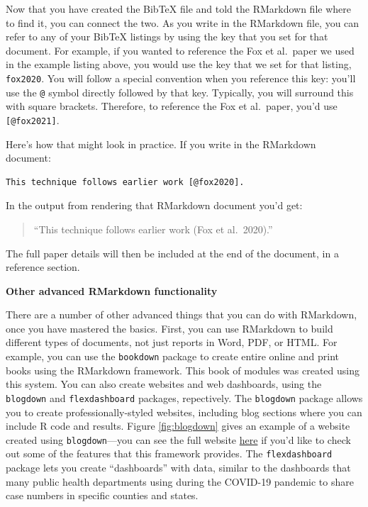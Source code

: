 \documentclass[]{tufte-book}
\begin{document}
Now that you have created the BibTeX file and told the RMarkdown file where to
find it, you can connect the two. As you write in the RMarkdown file, you can
refer to any of your BibTeX listings by using the key that you set for that
document. For example, if you wanted to reference the Fox et al.~paper we
used in the example listing above, you would use the key that we set for
that listing, \texttt{fox2020}.
You will follow a special convention when you reference this key: you'll use the
\texttt{@} symbol directly followed by that key. Typically, you will surround
this with square brackets. Therefore, to reference the Fox et al.~paper,
you'd use \texttt{{[}@fox2021{]}}.

Here's how that might look in practice. If you write in the RMarkdown document:

\begin{verbatim}
This technique follows earlier work [@fox2020].
\end{verbatim}

In the output from rendering that RMarkdown document you'd get:

\begin{quote}
``This technique follows earlier work (Fox et al.~2020).''
\end{quote}

The full paper details will then be included at the end of the document, in a reference
section.

\textbf{Other advanced RMarkdown functionality}

There are a number of other advanced things that you can do with RMarkdown, once
you have mastered the basics. First, you can use RMarkdown to build different
types of documents, not just reports in Word, PDF, or HTML. For example, you can
use the \texttt{bookdown} package to create entire online and print books using the
RMarkdown framework. This book of modules was created using this system.
You can also create websites and web dashboards, using the \texttt{blogdown} and
\texttt{flexdashboard} packages, repectively. The \texttt{blogdown} package allows you to
create professionally-styled websites, including blog sections where you can
include R code and results. Figure \ref{fig:blogdown} gives an example of a
website created using \texttt{blogdown}---you can see the full website
\href{https://kind-neumann-789611.netlify.app/}{here} if you'd like to check out some
of the features that this framework provides. The \texttt{flexdashboard} package lets
you create ``dashboards'' with data, similar to the dashboards that many public
health departments using during the COVID-19 pandemic to share case numbers in
specific counties and states.
\end{document}
